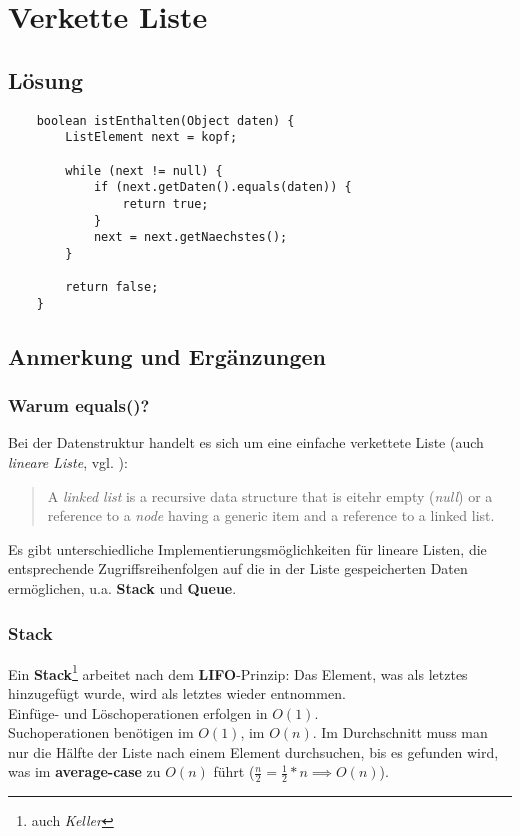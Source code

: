 \usepackage{csquotes}\chapter{Verkette Liste}



\section{Lösung}

\begin{verbatim}
    boolean istEnthalten(Object daten) {
        ListElement next = kopf;

        while (next != null) {
            if (next.getDaten().equals(daten)) {
                return true;
            }
            next = next.getNaechstes();
        }

        return false;
    }
\end{verbatim}

\section{Anmerkung und Ergänzungen}

\subsection*{Warum equals()?}

Bei der Datenstruktur handelt es sich um eine einfache verkettete Liste (auch \textit{lineare Liste}, vgl. \cite[238]{Knu97a}):\\

\blockquote[{\cite[142]{SW11}}]{
A \textit{linked list} is a recursive data structure that is eitehr empty (\textit{null}) or a reference to a \textit{node} having a generic item and a reference to a linked list.
}

\noindent
Es gibt unterschiedliche Implementierungsmöglichkeiten für lineare Listen, die entsprechende Zugriffsreihenfolgen auf die in der Liste gespeicherten Daten ermöglichen, u.a. \textbf{Stack} und \textbf{Queue}.\\

\subsection*{Stack}
Ein \textbf{Stack}\footnote{
auch \textit{Keller}
} arbeitet nach dem \textbf{LIFO}-Prinzip: Das Element, was als letztes hinzugefügt wurde, wird als letztes wieder entnommen.\\
Einfüge- und Löschoperationen erfolgen in $O(1)$.\\
Suchoperationen benötigen im  $O(1)$, im  $O(n)$.
Im Durchschnitt muss man nur die Hälfte der Liste nach einem Element durchsuchen, bis es gefunden wird, was im \textbf{average-case} zu $O(n)$ führt ($\frac{n}{2} = \frac{1}{2} * n \implies O(n)$).

